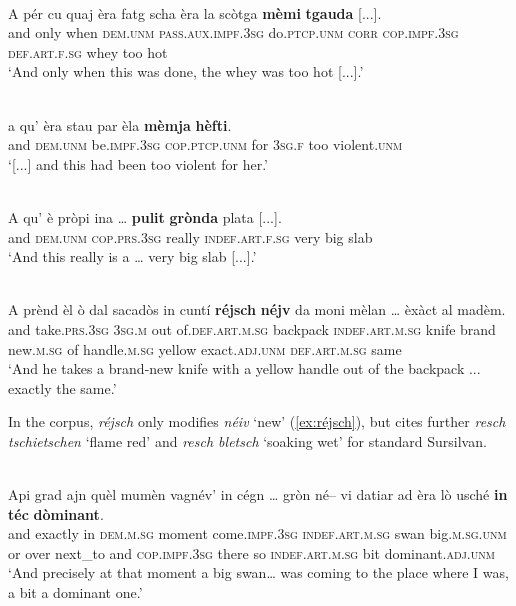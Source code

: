 \ea

\\
	\gll  A pér cu quaj èra fatg scha èra la scòtga \textbf{mèmi} \textbf{tgauda} [...].  \\
and only when \textsc{dem.unm} \textsc{pass.aux.impf.3sg} do.\textsc{ptcp.unm} \textsc{corr} \textsc{cop.impf.3sg} \textsc{def.art.f.sg} whey too hot\\
\glt `And only when this was done, the whey was too hot [...].'
\z

\ea

\\
\gll [...] a qu’ èra stau par èla \textbf{mèmja} \textbf{hèfti}.\\
{} and \textsc{dem.unm} be.\textsc{impf.3sg} \textsc{cop.ptcp.unm} for \textsc{3sg.f} too violent.\textsc{unm} \\
\glt `[...] and this had been too violent for her.'
\z

\ea

\\
\gll    A qu’ è pròpi ina … \textbf{pulit} \textbf{grònda} plata [...].\\
and \textsc{dem.unm} \textsc{cop.prs.3sg} really \textsc{indef.art.f.sg} {} very big slab\\
\glt `And this really is a … very big slab [...].'
\z

\ea
\label{ex:réjsch}
\\
\gll A prènd èl ò dal sacadòs in cuntí \textbf{réjsch} \textbf{néjv} da moni mèlan … èxàct al madèm.\\
and take.\textsc{prs.3sg} \textsc{3sg.m} out of.\textsc{def.art.m.sg} backpack \textsc{indef.art.m.sg} knife brand new.\textsc{m.sg} of handle.\textsc{m.sg} yellow {} exact.\textsc{adj.unm} \textsc{def.art.m.sg} same\\
\glt `And he takes a brand-new knife with a yellow handle out of the backpack ... exactly the same.'
\z

In the corpus, \textit{réjsch} only modifies \textit{néiv} `new' (\ref{ex:réjsch}), but \citet[931]{Decurtins2012} cites further \textit{resch tschietschen} `flame red' and \textit{resch bletsch} `soaking wet' for standard Sursilvan.

\ea

\\
\gll Api grad ajn quèl mumèn vagnév’ in cégn … gròn né– vi datiar ad èra lò usché \textbf{in} \textbf{téc} \textbf{dòminant}.\\
and exactly in \textsc{dem.m.sg} moment come.\textsc{impf.3sg} \textsc{indef.art.m.sg} swan {} big.\textsc{m.sg.unm} or over next\_to and \textsc{cop.impf.3sg} there so \textsc{indef.art.m.sg} bit dominant.\textsc{adj.unm}\\
\glt `And precisely at that moment a big swan… was coming to the place where I was, a bit a dominant one.'
\z


